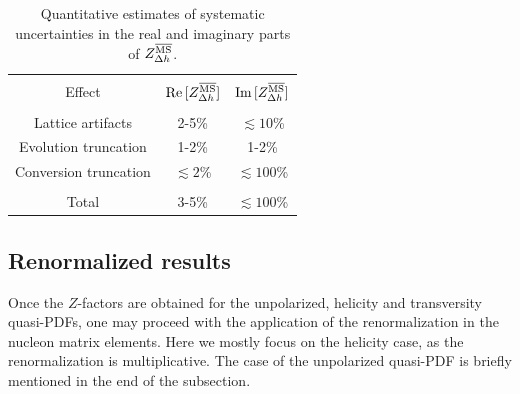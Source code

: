 {\small{
\begin{table}[!h]
\vspace*{0.25cm}
\begin{center}
\begin{tabular}{ccc}
\hline
\hline\\[-2ex]
Effect & ${\rm Re}\,[Z_{\Delta h}^{\overline{\rm MS}}]$   &  ${\rm Im}\,[Z_{\Delta h}^{\overline{\rm MS}}]$ \\[0.5ex]
\hline
\hline\\[-2ex]
Lattice artifacts & 2-5\% & $\lesssim10$\% \\[1ex]
Evolution truncation& 1-2\% & 1-2\% \\[1ex]
Conversion truncation& $\lesssim2$\% & $\lesssim100$\% \\[2ex]
\hline\\[-1.5ex]
Total & 3-5\% &  $\lesssim100$\% \\[1ex]
\hline
\hline
\end{tabular}
\vspace*{-0.4cm}
\begin{center}
\begin{minipage}{14cm}
\hspace*{3cm}
\caption{\small{Quantitative estimates of systematic uncertainties in the real and imaginary parts of $Z_{\Delta h}^{\overline{\rm MS}}$.}}
\label{tab2}
\end{minipage}
\end{center}
\end{center}
\end{table}
}}

\subsection{Renormalized results}
\label{sub3.2}

Once the $Z$-factors are obtained for the unpolarized, helicity and transversity quasi-PDFs, one may
proceed with the application of the renormalization in the nucleon matrix elements. Here we mostly focus
on the helicity case, as the renormalization is multiplicative. The case of the unpolarized quasi-PDF is
briefly mentioned in the end of the subsection.

